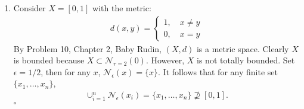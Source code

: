 \documentclass[11pt]{article}
\begin{document}
\begin{enumerate}
	\item 
%	
	Consider $X = [0,1]$ with the metric:
	\begin{align*}
	d(x,y) = \begin{cases}
	1, \quad x\neq y\\
	0, \quad x = y
	\end{cases}
	\end{align*}
	By Problem 10, Chapter 2, Baby Rudin, $(X,d)$ is a metric space. Clearly $X$ is bounded because $X \subset \mathcal{N}_{r=2}(0)$. However, $X$ is not totally bounded. Set $\epsilon = 1/2$, then for any $x$, $\mathcal{N}_\epsilon(x) = \{x\}$. It follows that for any finite set $\{x_1,\dots,x_n\}$,
	\begin{align*}
	\cup^n_{i=1}\mathcal{N}_\epsilon(x_i) = \{ x_1,\dots,x_n\} \not\supseteq [0,1].
	\end{align*}
	\hfill $\square$


\end{enumerate}
\end{document}
